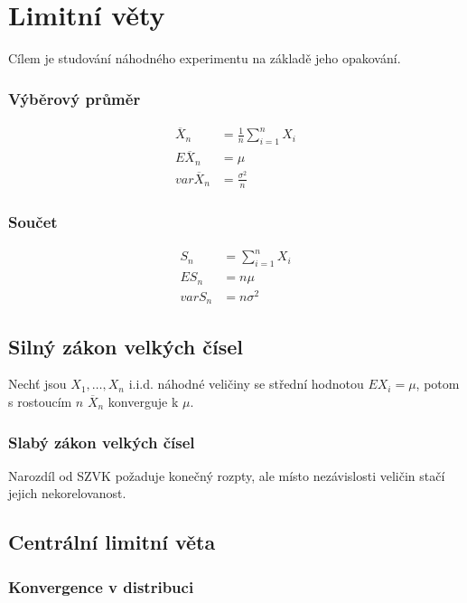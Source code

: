 \section{Limitní věty}

Cílem je studování náhodného experimentu na základě jeho opakování.

\subsubsection*{Výběrový průměr}

\begin{align*}
    \overline{X}_n     &= \frac{1}{n}\sum_{i=1}^{n}{X_i} \\
    E\overline{X}_n    &= \mu \\
    var \overline{X}_n &= \frac{\sigma^2}{n}
\end{align*}

\subsubsection*{Součet}

\begin{align*}
    S_n     &= \sum_{i=1}^{n}{X_i} \\
    ES_n    &= n\mu \\
    var S_n &= n\sigma^2
\end{align*}

\subsection{Silný zákon velkých čísel}

Nechť jsou $X_1, \dots, X_n$ i.i.d. náhodné veličiny se střední hodnotou $EX_i = \mu$, potom s rostoucím $n$ $\overline{X}_n$ konverguje k $\mu$.

\subsubsection*{Slabý zákon velkých čísel}

Narozdíl od SZVK požaduje konečný rozpty, ale místo nezávislosti veličin stačí jejich nekorelovanost.

\subsection{Centrální limitní věta}

\subsubsection*{Konvergence v distribuci}

